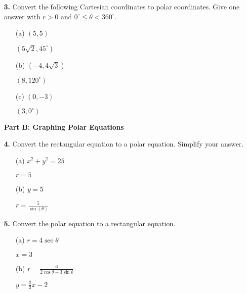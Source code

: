 \documentclass[12pt]{article}
\begin{document}
\textbf{3.} Convert the following Cartesian coordinates to polar coordinates. Give one answer with $r>0$ and $0^\circ \leq \theta < 360^\circ$.
\begin{enumerate}
    \item[(a)] $(5, 5)$
    \\[8pt]
    \begin{minipage}[t][3cm][t]{\linewidth}
        $\displaystyle (5\sqrt{2}, 45^\circ)$
    \end{minipage}

    \item[(b)] $(-4, 4\sqrt{3})$
    \\[8pt]
    \begin{minipage}[t][3cm][t]{\linewidth}
        $\displaystyle (8, 120^\circ)$
    \end{minipage}

    \item[(c)] $(0, -3)$
    \\[8pt]
    \begin{minipage}[t][3cm][t]{\linewidth}
        $\displaystyle (3, 0^\circ)$
    \end{minipage}
\end{enumerate}

\textbf{Part B: Graphing Polar Equations}

\textbf{4.} Convert the rectangular equation to a polar equation. Simplify your answer.
\begin{enumerate}
    \item[(a)] $x^2 + y^2 = 25$
    \\[8pt]
    \begin{minipage}[t][3cm][t]{\linewidth}
        $\displaystyle r=5$
    \end{minipage}

    \item[(b)] $y = 5$
    \\[8pt]
    \begin{minipage}[t][3cm][t]{\linewidth}
        $\displaystyle r=\frac{5}{\sin(\theta)}$
    \end{minipage}
\end{enumerate}

\textbf{5.} Convert the polar equation to a rectangular equation.
\begin{enumerate}
    \item[(a)] $r = 4\sec\theta$
    \\[8pt]
    \begin{minipage}[t][3cm][t]{\linewidth}
        $\displaystyle x=3$
    \end{minipage}

    \item[(b)] $r = \frac{6}{2\cos\theta - 3\sin\theta}$
    \\[8pt]
    \begin{minipage}[t][3cm][t]{\linewidth}
        $\displaystyle y=\frac{2}{3}x-2$
    \end{minipage}
\end{enumerate}
\end{document}
